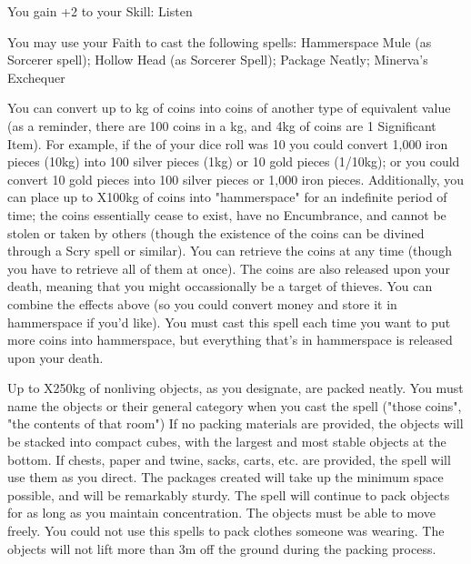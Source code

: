 {\GOD[
Name=Minerva,
Link=small-god-minerva,
GodOf=Archon of Trade and Commerce,
Holy=a knotted string hung from the belt - useful for counting (like an abacus)
]


You gain +2 to your Skill: Listen


You may use your Faith to cast the following spells: Hammerspace Mule (as Sorcerer spell); Hollow Head (as Sorcerer Spell); Package Neatly; Minerva's Exchequer


\LITURGY [
  Name= Minerva's Exchequer,
  Link= minerva-liturgy-minervas-exchequer,
  Paradigm= Entropy ,
  Save=  N ,
  Duration= n/a ,
  Counter=  n/a  ,
  Keywords= Hammerspace ,
  Target=   Close coins
]



You can convert up to \SUMDICE kg of coins into coins of another type of equivalent value (as a reminder, there are 100 coins in a kg, and 4kg of coins are 1 Significant Item).
For example, if the \SUMDICE of your dice roll was 10 you could convert 1,000 iron pieces (10kg) into 100 silver pieces (1kg) or 10 gold pieces (1/10kg); or you could convert 10 gold pieces into 100 silver pieces or 1,000 iron pieces.
Additionally, you can place up to \DICE X100kg of coins into "hammerspace" for an indefinite period of time; the coins essentially cease to exist, have no Encumbrance, and cannot be stolen or taken by others (though the existence of the coins can be divined through a Scry spell or similar).  You can retrieve the coins at any time (though you have to retrieve all of them at once).  The coins are also released upon your death, meaning that you might occassionally be a target of thieves.
You can combine the effects above (so you could convert money and store it in hammerspace if you'd like).  You must cast this spell each time you want to put more coins into hammerspace, but everything that's in hammerspace is released upon your death.

\LITURGY [
  Name= Package Neatly,
  Link=minerva-liturgy-package neatly,
  Paradigm= Entropy ,
  Save=  0 ,
  Duration= Concentration / Permanent ,
  Counter=  n/a  ,
  Keywords= None ,
  Target=   Nearby objects
]



 Up to \DICE X250kg of nonliving objects, as you designate, are packed neatly. You must name the objects or their general category when you cast the spell ("those coins", "the contents of that room") If no packing materials are provided, the objects will be stacked into compact cubes, with the largest and most stable objects at the bottom. If chests, paper and twine, sacks, carts, etc. are provided, the spell will use them as you direct. The packages created will take up the minimum space possible, and will be remarkably sturdy. The spell will continue to pack objects for as long as you maintain concentration. The objects must be able to move freely. You could not use this spells to pack clothes someone was wearing. The objects will not lift more than 3m off the ground during the packing process.





}
